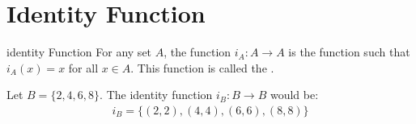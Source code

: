 \documentclass[../notes.tex]{subfiles}
\begin{document}
		\section{Identity Function}
			\begin{definition}{identity Function}
				For any set $A$, the function $i_{A}: A \rightarrow A$ is the function such that $i_{A}(x) = x$ for all $x \in A$. This function is called the .
			\end{definition}
			\begin{example}
				Let $B = \{2, 4, 6, 8\}$. The identity function $i_{B}: B \rightarrow B$ would be:
					\begin{align*}
						i_{B} = \bigl\{(2, 2), (4, 4), (6, 6), (8, 8)\bigr\}
					\end{align*}
			\end{example}
\end{document}
